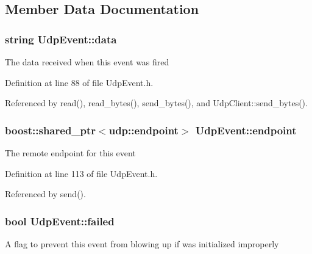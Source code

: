\subsection{Member Data Documentation}
\hypertarget{classUdpEvent_a20b7ebd90eb5b21aa7658e3e77ecc96c}{
\subsubsection[{data}]{\setlength{\rightskip}{0pt plus 5cm}string {\bf UdpEvent::data}}}
\label{classUdpEvent_a20b7ebd90eb5b21aa7658e3e77ecc96c}
The data received when this event was fired 

Definition at line 88 of file UdpEvent.h.



Referenced by read(), read\_\-bytes(), send\_\-bytes(), and UdpClient::send\_\-bytes().

\hypertarget{classUdpEvent_a50389e8d457b8f3cc425d78a5d416288}{
\subsubsection[{endpoint}]{\setlength{\rightskip}{0pt plus 5cm}boost::shared\_\-ptr$<$udp::endpoint$>$ {\bf UdpEvent::endpoint}}}
\label{classUdpEvent_a50389e8d457b8f3cc425d78a5d416288}
The remote endpoint for this event 

Definition at line 113 of file UdpEvent.h.



Referenced by send().

\hypertarget{classUdpEvent_a72bdcc219c080212438a4c045928c806}{
\subsubsection[{failed}]{\setlength{\rightskip}{0pt plus 5cm}bool {\bf UdpEvent::failed}}}
\label{classUdpEvent_a72bdcc219c080212438a4c045928c806}
A flag to prevent this event from blowing up if was initialized improperly 

